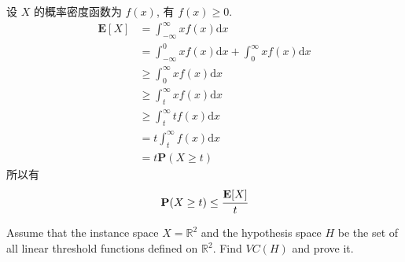 \documentclass[11pt,letter,notitlepage]{article}
\begin{document}
\begin{solution}
    设 $X$ 的概率密度函数为 $f(x)$, 有 $f(x)\geq 0$.
    $$\begin{aligned}
            \mathbf{E}[X]
             & = \int_{-\infty}^{\infty}{x f(x) \text{d}x}                                 \\
             & = \int_{-\infty}^{0}{x f(x) \text{d}x} + \int_{0}^{\infty}{xf(x) \text{d}x} \\
             & \geq \int_{0}^{\infty}{x f(x) \text{d}x}                                    \\
             & \geq \int_{t}^{\infty}{x f(x) \text{d}x}                                    \\
             & \geq \int_{t}^{\infty}{t f(x) \text{d}x}                                    \\
             & = t \int_{t}^{\infty}{ f(x) \text{d}x}                                      \\
             & = t \mathbf{P}(X\geq t)
        \end{aligned}$$
    所以有
    $$\mathbf{P}(X \geq t)\leq\cfrac{\mathbf{E}[X]}{t}$$
\end{solution}

\newpage

\begin{exercise}
    Assume that the instance space $X=\mathbb{R}^2$ and the hypothesis space $H$ be the set of all linear threshold functions defined on $\mathbb{R}^2$. Find $VC(H)$ and prove it.
\end{exercise}
\end{document}
